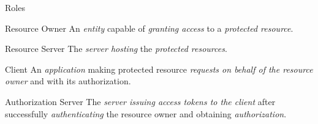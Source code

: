 \documentclass[aspectratio=169]{beamer}
\begin{document}
\begin{frame}{Roles}
	\begin{block}{Resource Owner}
		An \emph{entity} capable of \emph{granting access} to a \emph{protected resource}. \hfill \scriptsize{\cite[]{RFC6749}}
	\end{block}
	\pause
	\vspace*{-1mm}
	\begin{block}{Resource Server}
		The \emph{server hosting} the \emph{protected resources}. \hfill \scriptsize{\cite[]{RFC6749}}
	\end{block}
	\pause
	\vspace*{-1mm}
	\begin{block}{Client}
		An \emph{application} making protected resource \emph{requests on behalf of the resource owner} and with its authorization. \hfill \scriptsize{\cite[]{RFC6749}}
	\end{block}
	\pause
	\vspace*{-1mm}
	\begin{block}{Authorization Server}
		The \emph{server issuing access tokens to the client} after successfully \emph{authenticating} the resource owner and obtaining \emph{authorization}. \hfill \scriptsize{\cite[]{RFC6749}}
	\end{block}
\end{frame}
\end{document}
